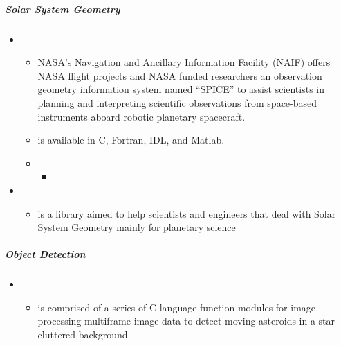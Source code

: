 \documentclass[letterpaper,10pt,english]{sphinxmanual}
\begin{document}
\subparagraph{Solar System Geometry}
\label{\detokenize{resource/astro/topics/solar_system:solar-system-geometry}}\begin{itemize}
\item {} 
\begin{itemize}
\item {} 
NASA’s Navigation and Ancillary Information Facility (NAIF) offers
NASA flight projects and NASA funded researchers an observation
geometry information system named “SPICE” to assist scientists in
planning and interpreting scientific observations from space-based
instruments aboard robotic planetary spacecraft.

\item {} 
 is
available in C, Fortran, IDL, and Matlab.

\item {} 
\begin{itemize}
\item {} 

\end{itemize}

\end{itemize}

\item {} 
\begin{itemize}
\item {} 
 is a library aimed to help scientists and engineers
that deal with Solar System Geometry mainly for planetary science

\end{itemize}

\end{itemize}


\subparagraph{Object Detection}
\label{\detokenize{resource/astro/topics/solar_system:object-detection}}\begin{itemize}
\item {} 
\begin{itemize}
\item {} 
 is comprised of a series of C language function modules
for image processing multiframe image data to detect moving
asteroids in a star cluttered background.

\end{itemize}

\end{itemize}
\end{document}
